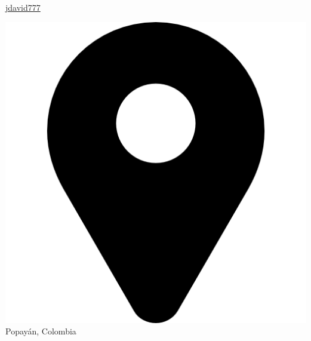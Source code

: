 \documentclass[american]{cv-class}
\begin{document}
\begin{aside}
    \href{https://github.com/jdavid777}{ jdavid777}
    
    \includegraphics[scale=0.030]{img/ubication-logo.png} Popayán, Colombia 
    

\end{aside}
\end{document}

